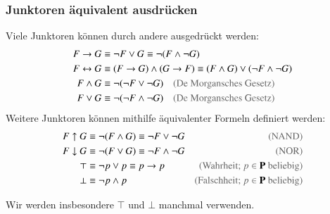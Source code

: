 \documentclass[aspectratio=1610,onlymath]{beamer}
\begin{document}
\begin{frame}\frametitle{Junktoren äquivalent ausdrücken}

Viele Junktoren können durch andere ausgedrückt werden:
% 
\begin{align*}
F\to G & \equiv \neg F\vee G \equiv \neg(F\wedge\neg G) \\
F\leftrightarrow G & \equiv (F\to G)\wedge(G\to F)\equiv (F\wedge G)\vee(\neg F\wedge \neg G) \\
F\wedge G & \equiv \neg(\neg F\vee\neg G) \quad \text{\textcolor{devilscss}{(De Morgansches Gesetz)}} \\
F\vee G & \equiv \neg(\neg F\wedge\neg G) \quad \text{\textcolor{devilscss}{(De Morgansches Gesetz)}}
\end{align*}\pause
%
Weitere Junktoren können mithilfe äquivalenter Formeln definiert werden:
% 
\begin{align*}
F\uparrow G & \equiv \neg (F\wedge G) \equiv \neg F\vee \neg G & \text{\textcolor{devilscss}{(NAND)}}\\
F\downarrow G & \equiv \neg (F\vee G) \equiv \neg F\wedge \neg G & \text{\textcolor{devilscss}{(NOR)}}\\
\top & \equiv \neg p\vee p \equiv p\to p & \text{\textcolor{devilscss}{(Wahrheit; $p\in\Slang{P}$ beliebig)}} \\
\bot & \equiv \neg p\wedge p & \text{\textcolor{devilscss}{(Falschheit; $p\in\Slang{P}$ beliebig)}}
\end{align*}\vspace{-4ex}

Wir werden insbesondere $\top$ und $\bot$ manchmal verwenden.

\end{frame}
\end{document}
